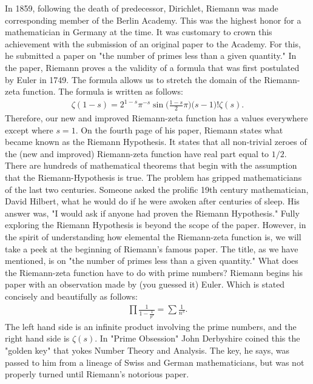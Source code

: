 \documentclass[12pt,oneside]{amsart}
\theoremstyle{definition}
\theoremstyle{remark}
\numberwithin{equation}{exer}
\begin{document}
\newline \indent
    In 1859, following the death of predecessor, Dirichlet, Riemann was made corresponding member of the Berlin Academy. This was the highest honor for a mathematician in Germany at the time.  It was customary to crown this achievement with the submission of an original paper to the Academy. For this, he submitted a paper on "the number of primes less than a given quantity." 
    \newline \indent 
In the paper, Riemann proves a the validity of a formula that was first postulated by Euler in 1749. The formula allows us to stretch the domain of the Riemann-zeta function. The formula is written as follows:
\begin{align*}
    \zeta(1-s) = 2^{1-s}\pi^{-s}\sin{\Bigg(\frac{1-s}{2}\pi}\Bigg)\big(s-1\big)!\zeta(s) .
\end{align*}
Therefore, our new and improved Riemann-zeta function has a values everywhere except where $s=1$.
\newline \indent
On the fourth page of his paper, Riemann states what became known as the Riemann Hypothesis. It states that all non-trivial zeroes of the (new and improved) Riemann-zeta function have real part equal to $1/2$. There are hundreds of mathematical theorems that begin with the assumption that the Riemann-Hypothesis is true. The problem has gripped mathematicians of the last two centuries. Someone asked the prolific 19th century mathematician, David Hilbert, what he would do if he were awoken after centuries of sleep. His answer was, "I would ask if anyone had proven the Riemann Hypothesis." 
 \newline \indent
Fully exploring the Riemann Hypothesis is beyond the scope of the paper. However, in the spirit of understanding how elemental the Riemann-zeta function is, we will take a peek at the beginning of Riemann's famous paper. The title, as we have mentioned, is on "the number of primes less than a given quantity." What does the Riemann-zeta function have to do with prime numbers? 
\newline \indent
Riemann begins his paper with an observation made by (you guessed it) Euler. Which is stated concisely and beautifully as follows:
\begin{align*}
    \prod \frac{1}{1 - \frac{1}{p^s}} = \sum \frac{1}{n^s}.
\end{align*}
The left hand side is an infinite product involving the prime numbers, and the right hand side is $\zeta(s)$. In "Prime Obsession" John Derbyshire coined this the "golden key" that yokes Number Theory and Analysis. The key, he says, was passed to him from a lineage of Swiss and German mathematicians, but was not properly turned until Riemann's notorious paper. 
\end{document}
